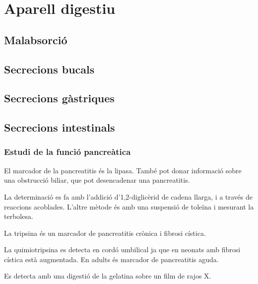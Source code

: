 
\section{Aparell digestiu}
\label{sec:aparell-digestiu}

\subsection{Malabsorció}
\label{sec:malabsorcio}

\subsection{Secrecions bucals}
\label{sec:secrecions-bucals}

\subsection{Secrecions gàstriques}
\label{sec:secr-gastr}

\subsection{Secrecions intestinals}
\label{sec:secr-intest}

\subsubsection{Estudi de la funció pancreàtica}
\label{sec:estudi-de-la}

El marcador de la pancreatitis és la lipasa. També pot donar
informació sobre una obstrucció biliar, que pot desencadenar una
pancreatitis.

La determinació es fa amb l'addició d'1,2-diglicèrid de cadena llarga,
i a través de reaccions acoblades. L'altre mètode és amb una suspensió
de toleïna i mesurant la terbolesa.

La tripsina és un marcador de pancreatitis crònica i fibrosi cística.

La quimiotripsina es detecta en cordó umbilical ja que en neonats amb
fibrosi cística està augmentada. En adults és marcador de pancreatitis
aguda.

Es detecta amb una digestió de la gelatina sobre un film de rajos X.

